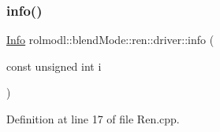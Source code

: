 \subsubsection{\texorpdfstring{info()}{info()}}
{\footnotesize\ttfamily \mbox{\hyperlink{structrolmodl_1_1blend_mode_1_1ren_1_1_info}{Info}} rolmodl\+::blend\+Mode\+::ren\+::driver\+::info (\begin{DoxyParamCaption}\item[{const unsigned int}]{i }\end{DoxyParamCaption})}



Definition at line 17 of file Ren.\+cpp.


